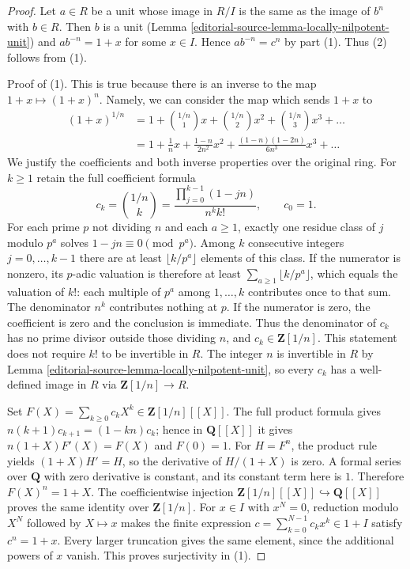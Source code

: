 \begin{proof}
Let $a \in R$ be a unit whose image in $R/I$ is the same as the image
of $b^n$ with $b \in R$. Then $b$ is a unit
(Lemma \ref{editorial-source-lemma-locally-nilpotent-unit}) and
$ab^{-n} = 1 + x$ for some $x \in I$. Hence $ab^{-n} = c^n$ by
part (1). Thus (2) follows from (1).

\medskip\noindent
Proof of (1). This is true because there is an inverse to the
map $1 + x \mapsto (1 + x)^n$. Namely, we can consider the map
which sends $1 + x$ to
\begin{align*}
(1 + x)^{1/n}
& =
1 + {1/n \choose 1}x +
{1/n \choose 2}x^2 +
{1/n \choose 3}x^3 + \ldots \\
& =
1 + \frac{1}{n} x + \frac{1 - n}{2n^2}x^2 +
\frac{(1 - n)(1 - 2n)}{6n^3}x^3 + \ldots
\end{align*}
We justify the coefficients and both inverse properties over the original ring.
For $k\geq1$ retain the full coefficient formula
$$
c_k={1/n\choose k}
=\frac{\prod_{j=0}^{k-1}(1-jn)}{n^k k!},\qquad c_0=1.
$$
For each prime $p$ not dividing $n$ and each $a\geq1$, exactly one
residue class of $j$ modulo $p^a$ solves $1-jn\equiv0\pmod{p^a}$.
Among $k$ consecutive integers $j=0,\ldots,k-1$ there are at least
$\lfloor k/p^a\rfloor$ elements of this class. If the numerator is
nonzero, its $p$-adic valuation is therefore at least
$\sum_{a\geq1}\lfloor k/p^a\rfloor$, which equals the valuation
of $k!$: each multiple of $p^a$ among $1,\ldots,k$ contributes once
to that sum. The denominator $n^k$ contributes nothing at $p$.
If the numerator is zero, the coefficient is zero and the conclusion
is immediate. Thus the denominator of $c_k$ has no prime divisor
outside those dividing $n$, and $c_k\in\mathbf Z[1/n]$.
This statement does not require $k!$ to be invertible in $R$.
The integer $n$ is invertible in $R$ by
Lemma \ref{editorial-source-lemma-locally-nilpotent-unit}, so every $c_k$ has a
well-defined image in $R$ via $\mathbf Z[1/n]\to R$.

\medskip\noindent
Set $F(X)=\sum_{k\geq0}c_kX^k\in\mathbf Z[1/n][[X]]$.
The full product formula gives
$n(k+1)c_{k+1}=(1-kn)c_k$; hence in $\mathbf Q[[X]]$ it gives
$n(1+X)F'(X)=F(X)$ and $F(0)=1$.
For $H=F^n$, the product rule yields $(1+X)H'=H$, so the derivative
of $H/(1+X)$ is zero. A formal series over $\mathbf Q$ with zero
derivative is constant, and its constant term here is $1$.
Therefore $F(X)^n=1+X$. The coefficientwise injection
$\mathbf Z[1/n][[X]]\hookrightarrow\mathbf Q[[X]]$ proves the same
identity over $\mathbf Z[1/n]$.
For $x\in I$ with $x^N=0$, reduction modulo $X^N$ followed by
$X\mapsto x$ makes the finite expression
$c=\sum_{k=0}^{N-1}c_kx^k\in1+I$ satisfy $c^n=1+x$.
Every larger truncation gives the same element, since the additional
powers of $x$ vanish. This proves surjectivity in (1).


\end{proof}

